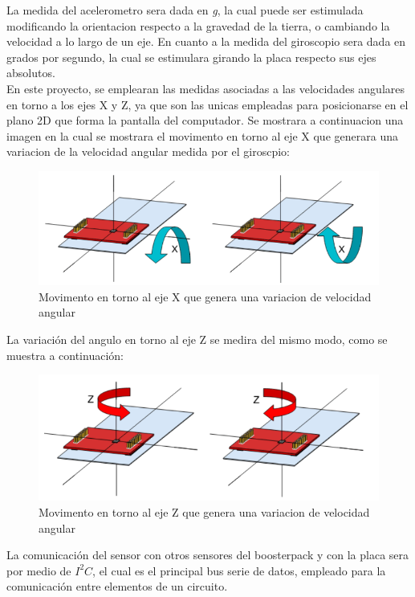 \documentclass[a4paper,twoside]{article}
\begin{document}
La medida del acelerometro sera dada en \textit{g}, la cual puede ser estimulada modificando la orientacion respecto a la gravedad de la tierra, o cambiando la velocidad a lo largo de un eje. En cuanto a la medida del giroscopio sera dada en grados por segundo, la cual se estimulara girando la placa respecto sus ejes absolutos. \\
En este proyecto, se emplearan las medidas asociadas a las velocidades angulares en torno a los ejes X y Z, ya que son las unicas empleadas para posicionarse en el plano 2D que forma la pantalla del computador. Se mostrara a continuacion una imagen en la cual se mostrara el movimento en torno al eje X que generara una variacion de la velocidad angular medida por el giroscpio:\\
\begin{figure}[h!]
 \centering
 \includegraphics[width=.6\textwidth]{../images/mov_axisX_bmi}
 \caption{Movimento en torno al eje X que genera una variacion de velocidad angular}
\end{figure}

La variación del angulo en torno al eje Z se medira del mismo modo, como se muestra a continuación: \\
\begin{figure}[h!]
 \centering
 \includegraphics[width=.6\textwidth]{../images/mov_axisZ_bmi}
 \caption{Movimento en torno al eje Z que genera una variacion de velocidad angular}
\end{figure}

\newpage
La comunicación del sensor con otros sensores del boosterpack y con la placa sera por medio de $I^2C$, el cual es el principal bus serie de datos, empleado para la comunicación entre elementos de un circuito. \\
\end{document}
